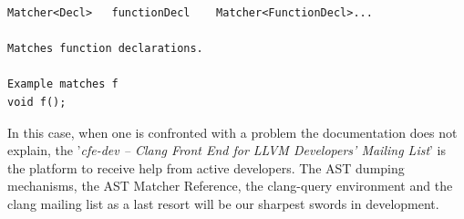 \begin{lstlisting}[numbers=none, frame=none, name={AST Matcher Reference documentation for the matcher functionDecl()}]
Matcher<Decl>	functionDecl	Matcher<FunctionDecl>...

Matches function declarations.

Example matches f
void f();
\end{lstlisting}
In this case, when one is confronted with a problem the documentation does not explain, the '\textit{cfe-dev -- Clang Front End for LLVM Developers' Mailing List}' is the platform to receive help from active developers. The AST dumping mechanisms, the AST Matcher Reference, the clang-query environment and the clang mailing list as a last resort will be our sharpest swords in development.





